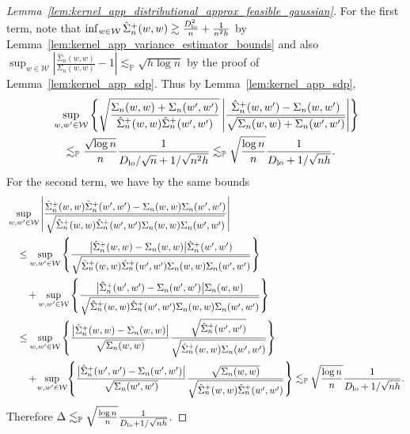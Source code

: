 \documentclass[11pt,lof]{puthesis}
\renewcommand{\P}{\ensuremath{\mathbb{P}}}
\newcommand{\cW}{\ensuremath{\mathcal{W}}}
\newcommand{\Dl}{\ensuremath{D_{\textup{lo}}}}
\theoremstyle{break}
\theoremstyle{proof}
\newtheorem{proof}{Proof}
\begin{document}
\begin{proof}[%
  Lemma~\ref{lem:kernel_app_distributional_approx_feasible_gaussian}]
  For the first term, note that
  $\inf_{w \in \cW} \hat \Sigma_n^+(w,w)
  \gtrsim \frac{\Dl^2}{n} + \frac{1}{n^2h}$
  by Lemma~\ref{lem:kernel_app_variance_estimator_bounds} and also
  $\sup_{w \in \cW}
  \left|\frac{\hat \Sigma_n(w,w)}{\Sigma_n(w,w)} - 1\right|
  \lesssim_\P \sqrt{h \log n}$
  by the proof of Lemma~\ref{lem:kernel_app_sdp}.
  Thus by Lemma~\ref{lem:kernel_app_sdp},
  \begin{align*}
    &\sup_{w, w' \in \cW}
    \left\{
      \sqrt{\frac{\Sigma_n(w,w) + \Sigma_n(w',w')}
      {\hat \Sigma_n^+(w,w) \hat \Sigma_n^+(w',w')}}
      \left|
        \frac{\hat \Sigma_n^+(w,w') - \Sigma_n(w,w')}
        {\sqrt{\Sigma_n(w,w) + \Sigma_n(w',w')}}
      \right|
    \right\} \\
    &\quad\lesssim_\P
    \frac{\sqrt{\log n}}{n}
    \frac{1}{\Dl/\sqrt{n} + 1/\sqrt{n^2h}}
    \lesssim_\P
    \sqrt{\frac{\log n}{n}}
    \frac{1}{\Dl + 1/\sqrt{n h}}.
  \end{align*}
  For the second term, we have by the same bounds
  \begin{align*}
    &\sup_{w, w' \in \cW}
    \left|
      \frac{\hat \Sigma_n^+(w,w) \hat \Sigma_n^+(w',w')
      - \Sigma_n(w,w) \Sigma_n(w',w')}
      {\sqrt{\hat \Sigma_n^+(w,w) \hat \Sigma_n^+(w',w')
      \Sigma_n(w,w) \Sigma_n(w',w')}}
    \right| \\
    &\quad\leq
    \sup_{w, w' \in \cW}
    \left\{
      \frac{\big| \hat \Sigma_n^+(w,w) - \Sigma_n(w,w)\big|
      \hat \Sigma_n^+(w',w')}
      {\sqrt{\hat \Sigma_n^+(w,w) \hat \Sigma_n^+(w',w')
      \Sigma_n(w,w) \Sigma_n(w',w')}}
    \right\} \\
    &\qquad+
    \sup_{w, w' \in \cW}
    \left\{
      \frac{\big| \hat \Sigma_n^+(w',w') - \Sigma_n(w',w')\big|
      \Sigma_n(w,w)}
      {\sqrt{\hat \Sigma_n^+(w,w) \hat \Sigma_n^+(w',w')
      \Sigma_n(w,w) \Sigma_n(w',w')}}
    \right\} \\
    &\quad\leq
    \sup_{w, w' \in \cW}
    \left\{
      \frac{\big| \hat \Sigma_n^+(w,w) - \Sigma_n(w,w)\big|}
      {\sqrt{\Sigma_n(w,w)}}
      \frac{\sqrt{\hat \Sigma_n^+(w',w')}}
      {\sqrt{\hat \Sigma_n^+(w,w) \Sigma_n(w',w')}}
    \right\} \\
    &\qquad+
    \!\sup_{w, w' \in \cW}\!
    \left\{
      \frac{\big| \hat \Sigma_n^+(w',w') - \Sigma_n(w',w')\big|}
      {\sqrt{\Sigma_n(w',w')}}
      \frac{\sqrt{\Sigma_n(w,w)}}
      {\sqrt{\hat \Sigma_n^+(w,w) \hat \Sigma_n^+(w',w')}}
    \right\}
    \lesssim_\P
    \sqrt{\frac{\log n}{n}}
    \frac{1}{\Dl + 1/\sqrt{n h}}.
  \end{align*}
  Therefore
  $\Delta \lesssim_\P \sqrt{\frac{\log n}{n}} \frac{1}{\Dl + 1/\sqrt{n h}}$.


\end{proof}
\end{document}
